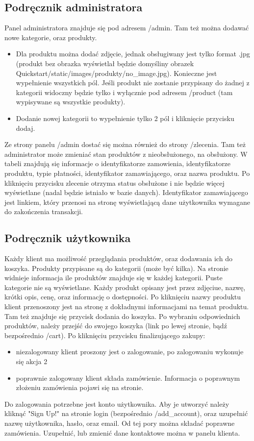 \documentclass[12pt]{article}
\begin{document}
  \subsection{Podręcznik administratora}
	Panel administratora znajduje się pod adresem /admin. Tam też można dodawać nowe kategorie, oraz produkty. 
	\begin {itemize}
		\item  Dla produktu można dodać zdjęcie, jednak obsługiwany jest tylko format .jpg (produkt bez obrazka wyświetlał będzie domyśliny obrazek Quickstart/static/images/produkty/no\_image.jpg). Konieczne jest wypełnienie wszystkich pól. Jeśli produkt nie zostanie przypisany do żadnej z kategorii widoczny będzie tylko i wyłącznie pod adresem /product (tam wypisywane są wszystkie produkty).
		\item Dodanie nowej kategorii to wypełnienie tylko 2 pól i kliknięcie przycisku dodaj.
	\end {itemize}
	Ze strony panelu /admin dostać się można również do strony /zlecenia. Tam też administrator może zmieniać stan produktów z nieobsłużonego, na obsłużony. W tabeli znajdują się informacje o identyfikatorze zamowienia, identyfikatorze produktu, typie płatności, identyfikator zamawiającego, oraz nazwa produktu. Po kliknięciu przycisku zlecenie otrzyma status obsłużone i nie będzie więcej wyświetlane (nadal będzie istniało w bazie danych). Identyfikator zamawiającego jest linkiem, który przenosi na stronę wyświetlającą dane użytkownika wymagane do zakończenia transakcji.
  \subsection {Podręcznik użytkownika}
	Każdy klient ma możliwość przeglądania produktów, oraz dodawania ich do koszyka. Produkty przypisane są do kategorii (może być kilka). Na stronie widnieje informacja ile produktów znajduje się w każdej kategorii. Puste kategorie nie są wyświetlane. Każdy produkt opisany jest przez zdjęciue, nazwę, krótki opis, cenę, oraz informację o dostępności. Po kliknięciu nazwy produktu klient przenoszony jest na stronę z dokładnymi informacjami na temat produktu. Tam też znajduje się przycisk dodania do koszyka.
Po wybraniu odpowiednich produktów, należy przejść do swojego koszyka (link po lewej stronie, bądź bezpośrednio /cart). Po kliknięciu przycisku finalizującego zakupy:
	\begin {itemize}
		\item niezalogowany klient proszony jest o zalogowanie, po zalogowaniu wykonuje się akcja 2
		\item poprawnie zalogowany klient składa zamówienie. Informacja o poprawnym złożeniu zamówienia pojawi się na stronie.
	\end {itemize}
	Do zalogowania potrzebne jest konto użytkownika. Aby je utworzyć należy kliknąć "Sign Up!" na stronie login (bezpośrednio /add\_account), oraz uzupełnić nazwę użytkownika, hasło, oraz email. Od tej pory można składać poprawne zamówienia. Uzupełnić, lub zmienić dane kontaktowe można w panelu klienta.



\end{document}

